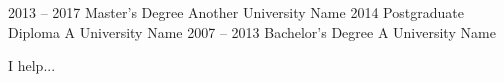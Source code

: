 
\begin{entrylist}
    \entry
        {2013 -- 2017}
        {Master's Degree}
        {Another University Name}
        {}
        {}
        {\lorem\lorem\lorem}
    \entry
        {2014}
        {Postgraduate Diploma}
        {A University Name}
        {}
        {}
        {\lorem\lorem}
    \entry
        {2007 -- 2013}
        {Bachelor's Degree}
        {A University Name}
        {}
        {}
        {\lorem\lorem}
\end{entrylist}


\begin{minipage}[t]{0.3\textwidth}
    \vspace{-\baselineskip}
    \begin{barchart}{3.5}
    \end{barchart}
\end{minipage}
%
\hfill
\begin{minipage}[t]{0.3\textwidth}
    \vspace{-\baselineskip}
\end{minipage}
%
\hfill
\begin{minipage}[t]{0.3\textwidth}
    \vspace{-\baselineskip}
    I help... \lorem
\end{minipage}


